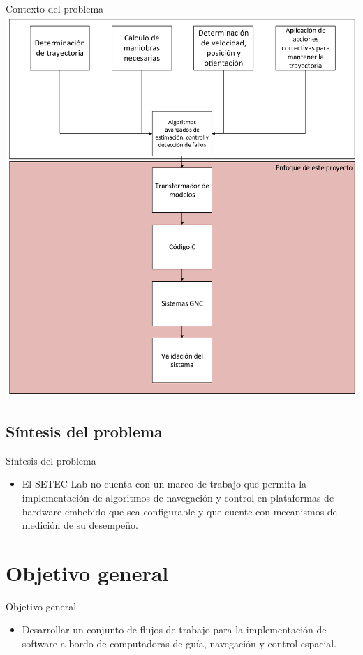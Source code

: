 \documentclass[10pt,aspectratio=169]{beamer} %
\begin{document}
\begin{frame}{Contexto del problema}
  \centering
  \includegraphics[scale=0.3]{planteamineto_problema/problema.pdf}
\end{frame}

\subsection{Síntesis del problema}
\begin{frame}{Síntesis del problema}
  \begin{itemize}
    \item El SETEC-Lab no cuenta con un marco de trabajo que permita la implementación de algoritmos de navegación y control en plataformas de hardware embebido que sea configurable y que cuente con mecanismos de medición de su desempeño.
  \end{itemize}
\end{frame}

\section{Objetivo general}
\begin{frame}{Objetivo general}
  \begin{itemize}
  \item Desarrollar un conjunto de flujos de trabajo para la implementación de software 
  a bordo de computadoras de guía, navegación y control espacial.
  \end{itemize}
\end{frame}
\end{document}
